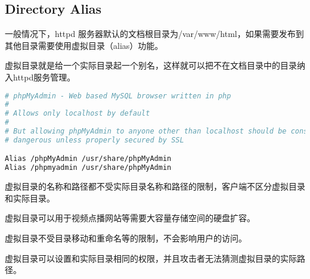 \subsection{Directory Alias}

一般情况下，httpd 服务器默认的文档根目录为/var/www/html，如果需要发布到其他目录需要使用虚拟目录（alias）功能。


虚拟目录就是给一个实际目录起一个别名，这样就可以把不在文档目录中的目录纳入httpd服务管理。



\begin{lstlisting}[language=bash]
# phpMyAdmin - Web based MySQL browser written in php
# 
# Allows only localhost by default
#
# But allowing phpMyAdmin to anyone other than localhost should be considered
# dangerous unless properly secured by SSL

Alias /phpMyAdmin /usr/share/phpMyAdmin
Alias /phpmyadmin /usr/share/phpMyAdmin
\end{lstlisting}

\begin{compactitem}
\item 虚拟目录的名称和路径都不受实际目录名称和路径的限制，客户端不区分虚拟目录和实际目录。

\item 虚拟目录可以用于视频点播网站等需要大容量存储空间的硬盘扩容。

\item 虚拟目录不受目录移动和重命名等的限制，不会影响用户的访问。

\item 虚拟目录可以设置和实际目录相同的权限，并且攻击者无法猜测虚拟目录的实际路径。

\end{compactitem}

\begin{lstlisting}[language=bash]

\end{lstlisting}



\begin{lstlisting}[language=bash]

\end{lstlisting}



\begin{lstlisting}[language=bash]

\end{lstlisting}



